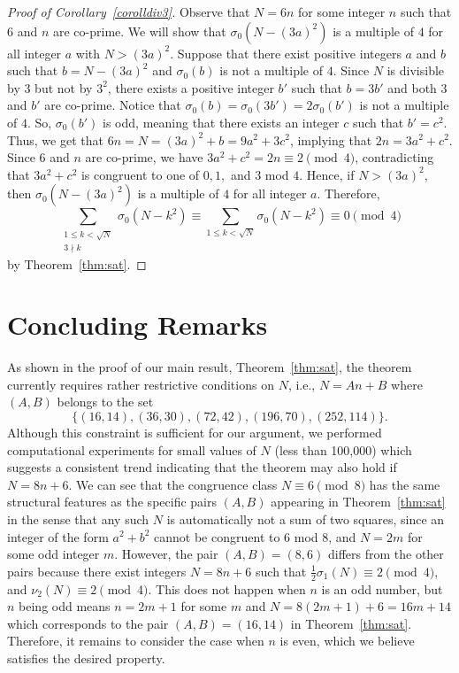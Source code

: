 \documentclass[a4paper,oneside,reqno]{amsart}
\theoremstyle{plain}
\theoremstyle{definition}
\theoremstyle{remark}
\begin{document}
		\begin{proof}[Proof of Corollary~\ref{corolldiv3}]
			Observe that $N=6n$ for some integer $n$ such that $6$ and $n$ are co-prime. We will show that $\sigma_0(N - (3a)^2)$ is a multiple of $4$ for all integer $a$ with $N > (3a)^2$. Suppose that there exist positive integers $a$ and $b$ such that $b = N - (3a)^2$ and $\sigma_0(b)$ is not a multiple of $4$. Since $N$ is divisible by $3$ but not by $3^2$, there exists a positive integer $b'$ such that $b=3b'$ and both $3$ and $b'$ are co-prime. Notice that $\sigma_0(b)=\sigma_0(3b')=2\sigma_0(b')$ is not a multiple of $4$. So, $\sigma_0(b')$ is odd, meaning that there exists an integer $c$ such that $b'=c^2$. Thus, we get that $6n=N=(3a)^2+b=9a^2+3c^2$, implying that $2n=3a^2+c^2$. Since $6$ and $n$ are co-prime, we have $3a^2+c^2=2n\equiv2\pmod4$, contradicting that $3a^2+c^2$ is congruent to one of $0,1,$ and $3$ mod $4$. Hence, if $N>(3a)^2$, then $\sigma_0(N-(3a)^2)$ is a multiple of $4$ for all integer $a$. Therefore,
			$$\sum\limits_{\substack{1\leq k<\sqrt{N}\\3\nmid k}} \sigma_0(N-k^2) \equiv\sum\limits_{1\leq k<\sqrt{N}} \sigma_0(N-k^2) \equiv 0 \pmod4$$
			by Theorem~\ref{thm:sat}.
		\end{proof}
		
		
		\section{Concluding Remarks}
		\label{sec:conclude}
		
		As shown in the proof of our main result, Theorem~\ref{thm:sat}, the theorem currently requires rather restrictive conditions on $N$, i.e., $N = An + B$ where $(A,B)$ belongs to the set $$\{ (16,14), (36,30), (72,42), (196,70), (252,114) \}.$$ Although this constraint is sufficient for our argument, we performed computational experiments for small values of $N$ (less than 100,000) which suggests a consistent trend indicating that the theorem may also hold if $N = 8n+6$. We can see that the congruence class $N \equiv 6 \pmod 8$ has the same structural features as the specific pairs $(A,B)$ appearing in Theorem~\ref{thm:sat} in the sense that any such $N$ is automatically not a sum of two squares, since an integer of the form $a^2 + b^2$ cannot be congruent to $6$ mod $8$, and $N = 2m$ for some odd integer $m$. However, the pair $(A,B) = (8,6)$ differs from the other pairs because there exist integers $N = 8n+6$ such that $\frac{1}{2}\sigma_1(N) \equiv 2 \pmod 4$, and $\nu_2(N) \equiv 2 \pmod 4$. This does not happen when $n$ is an odd number, but $n$ being odd means $n = 2m+1$ for some $m$ and $N = 8(2m+1) + 6 = 16m+14$ which corresponds to the pair $(A,B) = (16,14)$ in Theorem~\ref{thm:sat}. Therefore, it remains to consider the case when $n$ is even, which we believe satisfies the desired property. 
		
\end{document}
